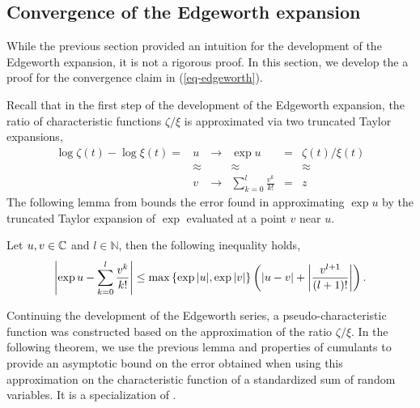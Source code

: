 \subsection{Convergence of the Edgeworth expansion}

While the previous section provided an intuition for the development of the Edgeworth expansion, it is not a rigorous proof. In this section, we develop the a proof for the convergence claim in (\ref{eq-edgeworth}).

Recall that in the first step of the development of the Edgeworth expansion, the ratio of characteristic functions $\zeta / \xi$ is approximated via two truncated Taylor expansions,
\begin{equation*}
    \begin{matrix}
        \log \zeta(t) - \log \xi(t) = & u & \longrightarrow & \exp u & = & \zeta(t) / \xi(t)\\
        &\approx & & \approx & & \approx \\
        &v  & \longrightarrow & \sum_{k=0}^l \frac{v^k}{k!} & = & z
    \end{matrix}
\end{equation*}
The following lemma from \cite[Theorem 2.5.3]{kolassa2006series} bounds the error found in approximating $\exp u$ by the truncated Taylor expansion of $\exp$ evaluated at a point $v$ near $u$.
\begin{lemma} \label{lemma-series}
    Let $u, v \in \mathbb{C}$ and $l \in \mathbb{N}$, then the following inequality holds,
    \begin{equation}
        \left|\exp{u} - \sum_{k=0}^l \frac{v^k}{k!}\right| \leq \max \left\{ \exp{|u|}, \exp{|v|} \right\}\left(\left|u - v\right| + \left|\frac{v^{l+1}}{(l+1)!}\right|\right).
    \end{equation}
\end{lemma}


Continuing the development of the Edgeworth series, a pseudo-characteristic function was constructed based on the approximation of the ratio $\zeta / \xi$. In the following theorem, we use the previous lemma and properties of cumulants to provide an asymptotic bound on the error obtained when using this approximation on the characteristic function of a standardized sum of random variables. It is a specialization of \cite[Corollary 2.5.4]{kolassa2006series}.


